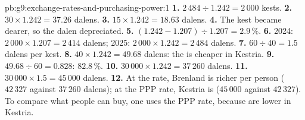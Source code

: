 \begin{solution}{pb:g9:exchange-rates-and-purchasing-power:1}
\textbf{1.} $2\,484 \div 1.242 = 2\,000$ kests.
\textbf{2.} $30 \times 1.242 = 37.26$ dalens.
\textbf{3.} $15 \times 1.242 = 18.63$ dalens.
\textbf{4.} The kest became dearer, so the dalen depreciated.
\textbf{5.} $(1.242 - 1.207) \div 1.207 = 2.9\,\%$.
\textbf{6.} 2024: $2\,000 \times 1.207 = 2\,414$ dalens; 2025: $2\,000 \times 1.242 = 2\,484$ dalens.
\textbf{7.} $60 \div 40 = 1.5$ dalens per kest.
\textbf{8.} $40 \times 1.242 = 49.68$ dalens: the  is cheaper in Kestria.
\textbf{9.} $49.68 \div 60 = 0.828$: $82.8\,\%$.
\textbf{10.} $30\,000 \times 1.242 = 37\,260$ dalens.
\textbf{11.} $30\,000 \times 1.5 = 45\,000$ dalens.
\textbf{12.} At the  rate, Brenland is richer per person ($42\,327$ against $37\,260$ dalens); at the
PPP rate, Kestria is ($45\,000$ against $42\,327$). To compare what people can buy, one uses the PPP rate,
because  are lower in Kestria.
\end{solution}
